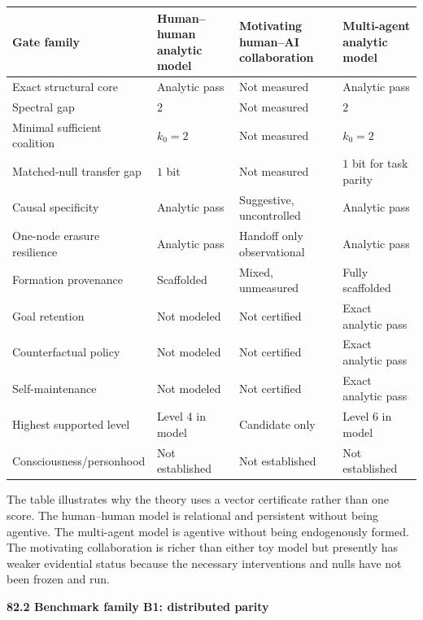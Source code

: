 \documentclass[11pt,letterpaper]{article}
\newcommand{\subtopic}[1]{%
 \vspace{0.45em}
 {\bfseries\color{AccentColor} #1\par}
}
\theoremstyle{plain}
\theoremstyle{definition}
\begin{document}
\begin{center}
\small
\begin{tabularx}{\textwidth}{@{}>{\raggedright\arraybackslash}p{}>{\raggedright\arraybackslash}p{}>{\raggedright\arraybackslash}p{}>{\raggedright\arraybackslash}X@{}}
\toprule
Gate family & Human--human analytic model & Motivating human--AI collaboration & Multi-agent analytic model \\
\midrule
Exact structural core & Analytic pass & Not measured & Analytic pass \\
Spectral gap & \(2\) & Not measured & \(2\) \\
Minimal sufficient coalition & \(k_0=2\) & Not measured & \(k_0=2\) \\
Matched-null transfer gap & \(1\) bit & Not measured & \(1\) bit for task parity \\
Causal specificity & Analytic pass & Suggestive, uncontrolled & Analytic pass \\
One-node erasure resilience & Analytic pass & Handoff only observational & Analytic pass \\
Formation provenance & Scaffolded & Mixed, unmeasured & Fully scaffolded \\
Goal retention & Not modeled & Not certified & Exact analytic pass \\
Counterfactual policy & Not modeled & Not certified & Exact analytic pass \\
Self-maintenance & Not modeled & Not certified & Exact analytic pass \\
Highest supported level & Level 4 in model & Candidate only & Level 6 in model \\
Consciousness/\allowbreak personhood & Not established & Not established & Not established \\
\bottomrule
\end{tabularx}
\end{center}

The table illustrates why the theory uses a vector certificate rather than one
score. The human--human model is relational and persistent without being
agentive. The multi-agent model is agentive without being endogenously formed.
The motivating collaboration is richer than either toy model but presently has
weaker evidential status because the necessary interventions and nulls have not
been frozen and run.

\subtopic{82.2 Benchmark family B1: distributed parity}
\end{document}
